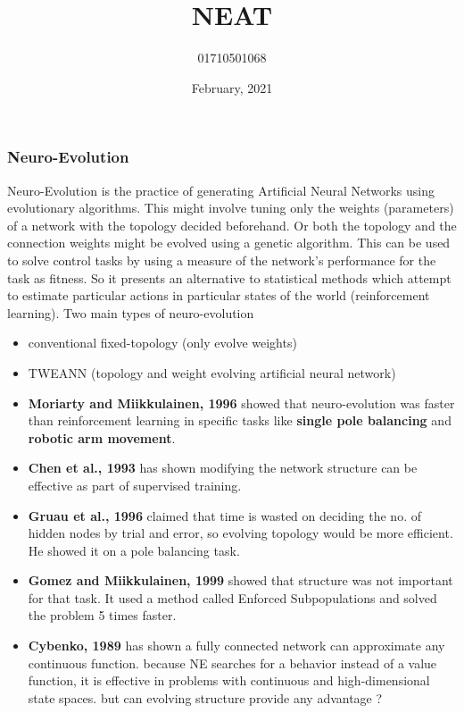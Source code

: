 \documentclass{beamer}
\title{NEAT}
\author{\small 01710501068}
\institute{\small Jadavpur University}
\date{\small February, 2021}
\begin{document}

\small

\begin{frame}
\titlepage
\end{frame}

\begin{frame}
\frametitle{Neuro-Evolution}
  Neuro-Evolution is the practice of generating Artificial Neural Networks using evolutionary algorithms. This might involve tuning only the weights (parameters) of a network with the topology decided beforehand. Or both the topology and the connection weights might be evolved using a genetic algorithm. This can be used to solve control tasks by using a measure of the network's performance for the task as fitness. So it presents an alternative to statistical methods which attempt to estimate particular actions in particular states of the world (reinforcement learning).
\bigbreak
  Two main types of neuro-evolution
\begin{itemize}
  \item conventional fixed-topology (only evolve weights)
  \item TWEANN (topology and weight evolving artificial neural network)
\end{itemize}
\end{frame}

\begin{frame}
\begin{itemize}
  \item \textbf{Moriarty and Miikkulainen, 1996} showed that neuro-evolution was faster than reinforcement learning in specific tasks like \textbf{single pole balancing} and \textbf{robotic arm movement}.
  \item \textbf{Chen et al., 1993} has shown modifying the network structure can be effective as part of supervised training.
  \item \textbf{Gruau et al., 1996} claimed that time is wasted on deciding the no. of hidden nodes by trial and error, so evolving topology would be more efficient. He showed it on a pole balancing task.
  \item \textbf{Gomez and Miikkulainen, 1999} showed that structure was not important for that task. It used a method called Enforced Subpopulations and solved the problem 5 times faster.
  \item \textbf{Cybenko, 1989} has shown a fully connected network can approximate any continuous function.
\bigbreak
because NE searches for a behavior instead of a value function, it is effective in problems with
continuous and high-dimensional state spaces. but can evolving structure provide any advantage ?
\end{itemize}
\end{frame}
\end{document}

